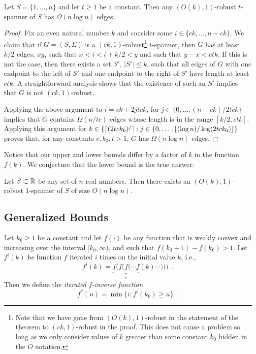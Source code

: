 \documentclass{patmorin}
\begin{document}
\begin{thm}
Let $S=\{1,\ldots,n\}$ and let $t\ge 1$ be a constant.  Then any
$(O(k),1)$-robust $t$-spanner of $S$ has $\Omega(n\log n)$ edges.
\end{thm}

\begin{proof}
Fix an even natural number $k$ and consider some $i\in\{ck,\ldots,n-ck\}$.
We claim that if $G=(S,E)$ is a $(ck,1)$-robust\footnote{Note that we
have gone from $(O(k),1)$-robust in the statement of the theorem to
$(ck,1)$-robust in the proof.  This does not cause a problem so long
as we only consider values of $k$ greater than some constant $k_0$
hidden in the $O$ notation.} $t$-spanner, then $G$ has at least $k/2$
edges, $xy$, such that $x < i < i+k/2 < y$ and such that $y-x < ctk$.
If this is not the case, then there exists a set $S'$, $|S'|\le k$,
such that all edges of $G$ with one endpoint to the left of $S'$
and one endpoint to the right of $S'$ have length at least $ctk$.
A straightforward analysis shows that the existence of such an $S'$
implies that $G$ is not $(ck,1)$-robust.

Applying the above argument to $i=ck+2jtck$, for
$j\in\{0,\ldots,(n-ck)/2tck\}$ implies that $G$ contains $\Omega(n/tc)$
edges whose length is in the range $[k/2,ctk]$.  Applying this
argument for $k\in\{{\lceil (2tck_0)^{j} \rceil} : j\in\{0,\ldots,{\lfloor (\log
n)/\log(2tck_0) \rfloor}\}$ proves that, for any constants $c,k_0,t>1$, $G$
has $\Omega(n\log n)$ edges.
\end{proof}

Notice that our upper and lower bounds differ by a factor of $k$ in the
function $f(k)$.  We conjecture that the lower bound is the true answer:

\begin{conj}
Let $S\subset \mathbb{R}$ be any set of $n$ real numbers.  Then there exists an
$(O(k),1)$-robust $1$-spanner of $S$ of size $O(n\log n)$.
\end{conj}

\subsection{Generalized Bounds}

Let $k_0\ge 1$ be a constant and let $f(\cdot)$ be any function that is
weakly convex and increasing over the interval $[k_0,\infty)$, and such
that $f(k_0+1)-f(k_0) > 1$.  Let $f^{i}(k)$ be function $f$ iterated
$i$ times on the initial value $k$, i.e.,
\[
   f^{i}(k) = \underbrace{f(f(f(\cdots f}_{i}(k)\cdots))) \enspace .
\]
Then we define the \emph{iterated
$f$-inverse function}
\[
   f^*(n) = \min\{i : f^{i}(k_0) \ge n\} \enspace .
\] 
\end{document}
